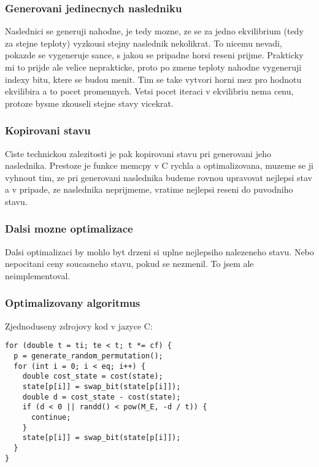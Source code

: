 \documentclass[12pt,a4paper]{article}
\begin{document}
\subsubsection{Generovani jedinecnych nasledniku}

Naslednici se generuji nahodne, je tedy mozne, ze se za jedno ekvilibrium (tedy za stejne teploty) vyzkousi stejny naslednik nekolikrat. To nicemu nevadi, pokazde se vygeneruje sance, s jakou se pripadne horsi reseni prijme. Prakticky mi to prijde ale velice neprakticke, proto po zmene teploty nahodne vygeneruji indexy bitu, ktere se budou menit. Tim se take vytvori horni mez pro hodnotu ekvilibira a to pocet promennych. Vetsi pocet iteraci v ekvilibriu nema cenu, protoze bysme zkouseli stejne stavy vicekrat.

\subsubsection{Kopirovani stavu}

Ciste technickou zalezitosti je pak kopirovani stavu pri generovani jeho naslednika. Prestoze je funkce memcpy v C rychla a optimalizovana, muzeme se ji vyhnout tim, ze pri generovani naslednika budeme rovnou upravovat nejlepsi stav a v pripade, ze naslednika neprijmeme, vratime nejlepsi reseni do puvodniho stavu.

\subsubsection{Dalsi mozne optimalizace}

Dalsi optimalizaci by mohlo byt drzeni si uplne nejlepsiho nalezeneho stavu. Nebo nepocitani ceny soucasneho stavu, pokud se nezmenil. To jsem ale neimplementoval.


\subsubsection{Optimalizovany algoritmus}

Zjednoduseny zdrojovy kod v jazyce C:

\begin{lstlisting}[frame=single]
for (double t = ti; te < t; t *= cf) {
  p = generate_random_permutation();
  for (int i = 0; i < eq; i++) {
    double cost_state = cost(state);
    state[p[i]] = swap_bit(state[p[i]]);
    double d = cost_state - cost(state);
    if (d < 0 || randd() < pow(M_E, -d / t)) {
      continue;
    }
    state[p[i]] = swap_bit(state[p[i]]);
  }
}
\end{lstlisting}
\end{document}
